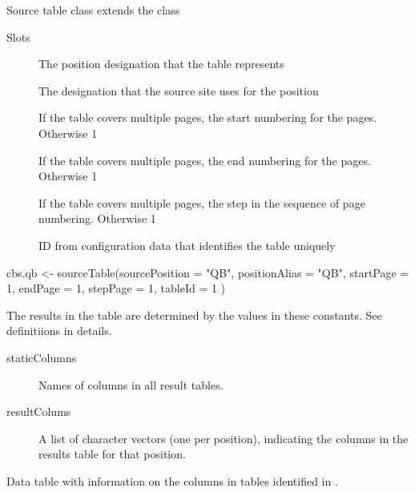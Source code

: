 \documentclass[a4paper]{book}
\begin{document}
%
\begin{Description}\relax
Source table class extends the  class
\end{Description}
%
\begin{Section}{Slots}

\begin{description}

\item[] The position designation that the table represents

\item[] The designation that the source site uses for the position

\item[] If the table covers multiple pages, the start numbering for the
pages. Otherwise 1

\item[] If the table covers multiple pages, the end numbering for the
pages. Otherwise 1

\item[] If the table covers multiple pages, the step in the sequence of
page numbering. Otherwise 1

\item[] ID from configuration data that identifies the table uniquely

\end{description}
\end{Section}
%
\begin{Examples}
\begin{ExampleCode}
cbs.qb <- sourceTable(sourcePosition = "QB",
                      positionAlias = "QB",
                      startPage = 1,
                      endPage = 1,
                      stepPage = 1,
                      tableId = 1
                     )
\end{ExampleCode}
\end{Examples}
%
\begin{Description}\relax
The results in the  table are determined by the values in
these constants. See definitiions in details.
\begin{description}

\item[staticColumns] Names of columns in all result tables.
\item[resultColums] A list of character vectors (one per position), indicating
the columns in the results table for that position.

\end{description}


Data table with information on the columns in tables identified in .
\end{Description}
\end{document}
